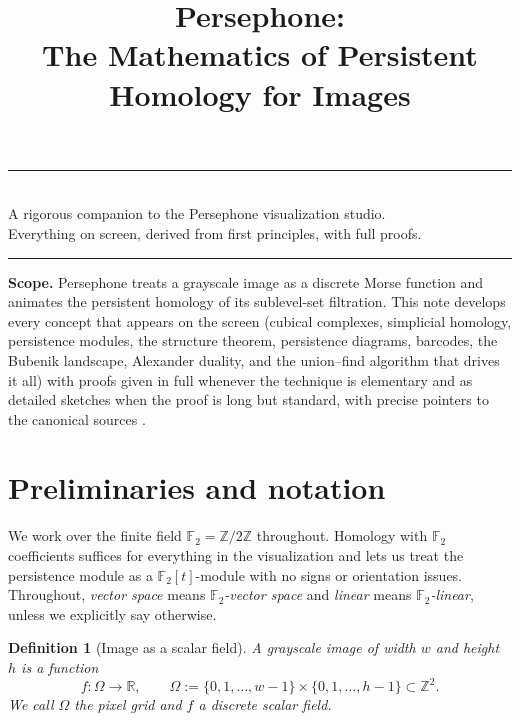 \documentclass[11pt]{article}
\title{\vspace*{-1cm}\Large \bfseries Persephone: \\[0.2em]
\large The Mathematics of Persistent Homology for Images}
\author{}
\date{}
\theoremstyle{persdef}
\newtheorem{definition}{Definition}[section]
\newcommand{\R}{\mathbb{R}}
\newcommand{\Z}{\mathbb{Z}}
\newcommand{\F}{\mathbb{F}}
\newcommand{\Ftwo}{\F_2}
\begin{document}
\maketitle
\vspace{-2em}

\begin{center}
\rule{0.6\textwidth}{0.4pt}\\[0.4em]
{\small A rigorous companion to the Persephone visualization studio.\\
Everything on screen, derived from first principles, with full proofs.}\\[0.2em]
\rule{0.6\textwidth}{0.4pt}
\end{center}

\vspace{0.4em}

\noindent
\textbf{Scope.} Persephone treats a grayscale image as a discrete Morse function and animates the persistent homology of its sublevel-set filtration. This note develops every concept that appears on the screen (cubical complexes, simplicial homology, persistence modules, the structure theorem, persistence diagrams, barcodes, the Bubenik landscape, Alexander duality, and the union--find algorithm that drives it all) with proofs given in full whenever the technique is elementary and as detailed sketches when the proof is long but standard, with precise pointers to the canonical sources \cite{EH10,Car09,Bub15,CSEH07,Hat02,ZC05,CB15}.

\tableofcontents
\bigskip

\section{Preliminaries and notation}

We work over the finite field $\Ftwo = \Z/2\Z$ throughout. Homology with $\Ftwo$ coefficients suffices for everything in the visualization and lets us treat the persistence module as a $\Ftwo[t]$-module with no signs or orientation issues. Throughout, \emph{vector space} means \emph{$\Ftwo$-vector space} and \emph{linear} means \emph{$\Ftwo$-linear}, unless we explicitly say otherwise.

\begin{definition}[Image as a scalar field]\label{def:image}
A grayscale image of width $w$ and height $h$ is a function
\[
f : \Omega \to \R, \qquad \Omega := \{0,1,\dots,w{-}1\}\times\{0,1,\dots,h{-}1\}\subset\Z^2.
\]
We call $\Omega$ the \emph{pixel grid} and $f$ a \emph{discrete scalar field}.
\end{definition}
\end{document}
